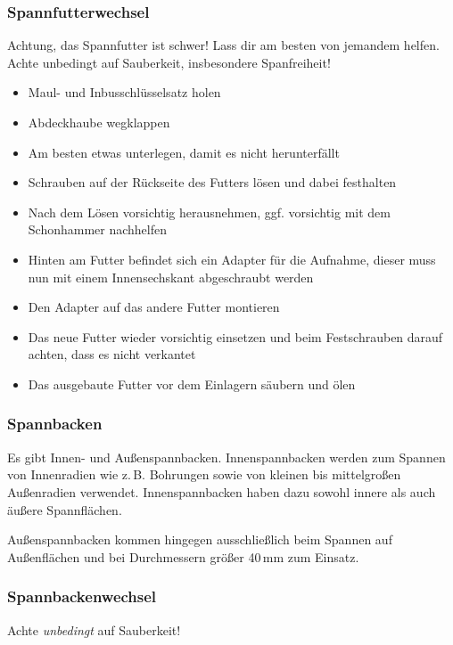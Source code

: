 \documentclass{\basedir/fablab-document}
\begin{document}

\subsubsection{Spannfutterwechsel}

Achtung, das Spannfutter ist schwer! Lass dir am besten von jemandem helfen. Achte unbedingt auf Sauberkeit, insbesondere Spanfreiheit!
\begin{itemize}
\item Maul- und Inbusschlüsselsatz holen
\item Abdeckhaube wegklappen
\item Am besten etwas unterlegen, damit es nicht herunterfällt
\item Schrauben auf der Rückseite des Futters lösen und dabei festhalten 
\item Nach dem Lösen vorsichtig herausnehmen, ggf. vorsichtig mit dem Schonhammer nachhelfen
\item Hinten am Futter befindet sich ein Adapter für die Aufnahme, dieser muss nun mit einem Innensechskant abgeschraubt werden
\item Den Adapter auf das andere Futter montieren
\item Das neue Futter wieder vorsichtig einsetzen und beim Festschrauben darauf achten, dass es nicht verkantet
\item Das ausgebaute Futter vor dem Einlagern säubern und ölen
\end{itemize}

\subsubsection{Spannbacken}

Es gibt Innen- und Außenspannbacken.
Innenspannbacken werden zum Spannen von Innenradien wie z.\,B. Bohrungen sowie von kleinen bis mittelgroßen Außenradien verwendet. Innenspannbacken haben dazu sowohl innere als auch äußere Spannflächen.

Außenspannbacken kommen hingegen ausschließlich beim Spannen auf Außenflächen und bei Durchmessern größer 40\,mm zum Einsatz.


\subsubsection{Spannbackenwechsel}
\label{zerspanung:spannbackenwechsel}
Achte \emph{unbedingt} auf Sauberkeit!
 
\end{document}
